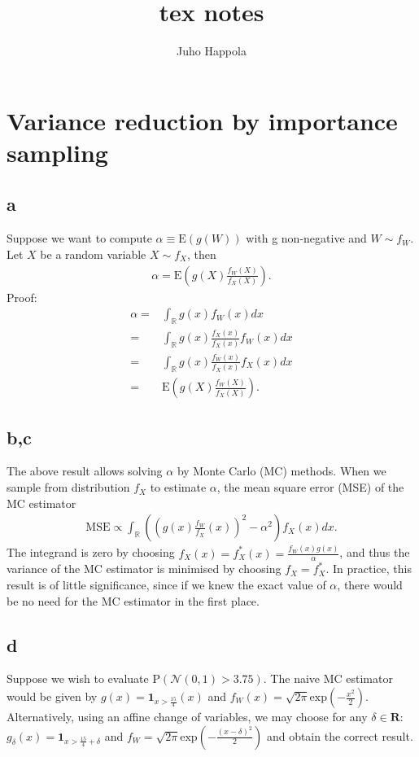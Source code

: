 \documentclass[a4paper,11pt]{article}
\title{tex notes}
\author{Juho Happola}
\newcommand{\expf}[1]{\mathrm{exp}\left ( {#1}\right )}
\newcommand{\parent}[1]{\left( {#1} \right)}
\newcommand{\probb}[1]{\mathrm{P} \parent{{#1}}}
\newcommand{\expp}[1]{\mathrm{E} \parent{{#1}}}
\begin{document}
\section*{Variance reduction by importance sampling}

\subsection*{a}
Suppose we want to compute $\alpha \equiv \expp{g \parent{W}}$
with g non-negative and $W \sim f_W$. Let $X$ be a random variable
$X \sim f_X$, then
\begin{align}
\alpha = \expp{g \parent{X} \frac{f_W \parent{X}}{ f_X \parent{X}}}.
\end{align}
Proof:
\begin{align}
\alpha =& \int_{\mathbb R} g \parent{x} f_W \parent{x} dx
\\
=& 
\int_{\mathbb R} g \parent{x} \frac{ f_X \parent{x} }{ f_X \parent{x} } f_W \parent{x} dx
\\
=& 
\int_{\mathbb R} g \parent{x} \frac{ f_W \parent{x} }{ f_X \parent{x} } f_X \parent{x} dx
\\
=& \expp{g \parent{X} \frac{ f_W \parent{X} }{ f_X \parent{X} } }.
\end{align}

\subsection*{b,c}
The above result allows solving $\alpha$ by Monte Carlo (MC) methods.
When we sample from distribution $f_X$ to estimate $\alpha$,
the mean square error (MSE) of the MC estimator 
\begin{align}
\mathrm{MSE} \propto \int_{\mathbb R}  \parent{ \parent{g\parent{x} \frac{f_W}{f_X} \parent{x}}^2 - \alpha^2 }  f_X \parent{x} dx.
\end{align}
The integrand is zero by choosing $f_X \parent{x}=f_X^* \parent{x} = \frac{f_W \parent{x} g \parent{x}}{\alpha}$, and thus
the variance of the MC estimator is minimised by choosing $f_X=f_X^*$. In practice, this result is of little significance,
since if we knew the exact value of $\alpha$, there would be no need for the MC estimator in the first place.

\subsection*{d}
Suppose we wish to evaluate $\probb{\mathcal N \parent{0,1} >3.75}$.
The naive MC estimator would be given by $g \parent{x} = \mathbf 1_{x>\frac{15}{4}} \parent{x}$ and
$f_W \parent{x} = \sqrt{2 \pi } \expf{-\frac{x^2}{2}}$. Alternatively, using an affine change
of variables,
we may choose for any $\delta \in \mathbf R$: $g_\delta \parent{x} = \mathbf 1_{x>\frac{15}{4}+\delta}$
and $f_W = \sqrt{2 \pi } \expf{-\frac{\parent{x-\delta}^2}{2}}$ and obtain the correct result.
\end{document}
